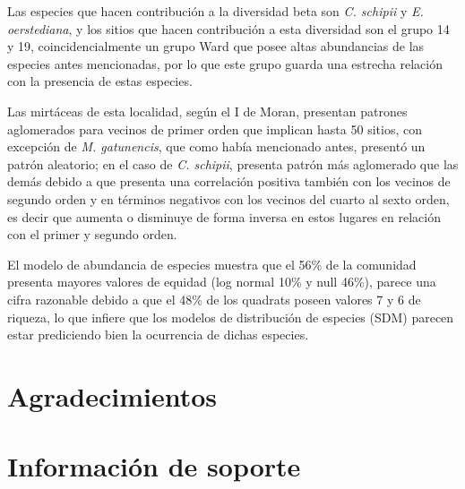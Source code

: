 \documentclass[11pt,]{article}
\newcommand{\beginsupplement}{ \setcounter{table}{0} \renewcommand{\thetable}{S\arabic{table}} \setcounter{figure}{0} \renewcommand{\thefigure}{S\arabic{figure}} }
\begin{document}
Las especies que hacen contribución a la diversidad beta son \emph{C.
schipii} y \emph{E. oerstediana}, y los sitios que hacen contribución a
esta diversidad son el grupo 14 y 19, coincidencialmente un grupo Ward
que posee altas abundancias de las especies antes mencionadas, por lo
que este grupo guarda una estrecha relación con la presencia de estas
especies.

Las mirtáceas de esta localidad, según el I de Moran, presentan patrones
aglomerados para vecinos de primer orden que implican hasta 50 sitios,
con excepción de \emph{M. gatunencis}, que como había mencionado antes,
presentó un patrón aleatorio; en el caso de \emph{C. schipii}, presenta
patrón más aglomerado que las demás debido a que presenta una
correlación positiva también con los vecinos de segundo orden y en
términos negativos con los vecinos del cuarto al sexto orden, es decir
que aumenta o disminuye de forma inversa en estos lugares en relación
con el primer y segundo orden.

El modelo de abundancia de especies muestra que el 56\% de la comunidad
presenta mayores valores de equidad (log normal 10\% y null 46\%),
parece una cifra razonable debido a que el 48\% de los quadrats poseen
valores 7 y 6 de riqueza, lo que infiere que los modelos de distribución
de especies (SDM) parecen estar prediciendo bien la ocurrencia de dichas
especies.

\section{Agradecimientos}\label{agradecimientos}

\section{Información de soporte}\label{informaciuxf3n-de-soporte}

\beginsupplement
\end{document}
